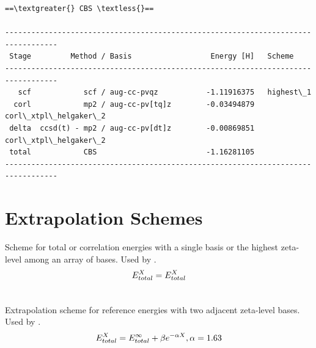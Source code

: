 \documentclass[letterpaper,10pt,english]{sphinxmanual}
\begin{document}
\begin{Verbatim}[commandchars=\\\{\}]
==\textgreater{} CBS \textless{}==

----------------------------------------------------------------------------------
 Stage         Method / Basis                  Energy [H]   Scheme
----------------------------------------------------------------------------------
   scf            scf / aug-cc-pvqz           -1.11916375   highest\_1
  corl            mp2 / aug-cc-pv[tq]z        -0.03494879   corl\_xtpl\_helgaker\_2
 delta  ccsd(t) - mp2 / aug-cc-pv[dt]z        -0.00869851   corl\_xtpl\_helgaker\_2
 total            CBS                         -1.16281105
----------------------------------------------------------------------------------
\end{Verbatim}


\section{Extrapolation Schemes}
\label{index:extrapolation-schemes}

\begin{fulllineitems}
\label{index:wrappers.highest_1}
Scheme for total or correlation energies with a single basis or the highest
zeta-level among an array of bases. Used by {\hyperref[index:wrappers.complete_basis_set]{}}.
\begin{gather}
\begin{split}E_{total}^X = E_{total}^X\end{split}\notag\\\begin{split}\end{split}\notag
\end{gather}
\end{fulllineitems}


\begin{fulllineitems}
\label{index:wrappers.scf_xtpl_helgaker_2}
Extrapolation scheme for reference energies with two adjacent zeta-level bases.
Used by {\hyperref[index:wrappers.complete_basis_set]{}}.
\begin{gather}
\begin{split}E_{total}^X = E_{total}^{\infty} + \beta e^{-\alpha X}, \alpha = 1.63\end{split}\notag\\\begin{split}\end{split}\notag
\end{gather}
\end{fulllineitems}
\end{document}
